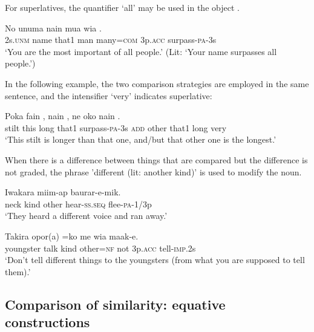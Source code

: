 For superlatives, the quantifier  `all' may be used in the object .

\ea%
\label{ex:6:x1330}
\gll No  unuma  nain  mua    wia  . \\
2s.\textsc{unm}  name  that1  man  many=\textsc{com}  3p.\textsc{acc}  surpass-\textsc{pa}-3s\\
\glt `You are the most important of all people.' (Lit: `Your name surpasses all people.')
\z

In the following example, the two comparison strategies are employed in the same sentence, and the intensifier  `very' indicates superlative:

\ea%
\label{ex:6:x1337}
\gll Poka  fain  ,  nain  ,  ne  oko  nain   .\\
stilt  this  long  that1  surpass-\textsc{pa}-3s  \textsc{add}  other  that1  long very\\
\glt `This stilt is longer than that one, and/but that other one is the longest.'
\z

When there is a difference between things that are compared but the difference is not graded, the phrase  'different (lit: another kind)' is used to modify the noun.

\ea%
\label{ex:6:x1334}
\gll Iwakara     miim-ap  baurar-e-mik. \\
neck  kind  other  hear-\textsc{ss}.\textsc{seq}  flee-\textsc{pa}-1/3p\\
\glt `They heard a different voice and ran away.'
\z

\ea%
\label{ex:6:x1335}
\gll Takira  opor(a)    =ko  me  wia  maak-e. \\
youngster  talk  kind  other=\textsc{nf}  not  3p.\textsc{acc}  tell-\textsc{imp}.2s\\
\glt `Don't tell different things to the youngsters (from what you are supposed to tell them).'
\z

\subsection{Comparison of similarity: equative constructions}\footnotemark{}

